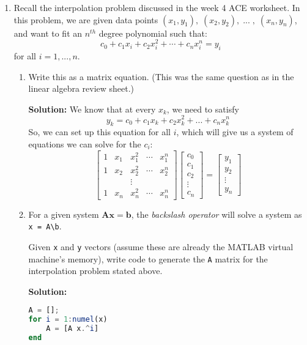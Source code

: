 \documentclass[letterpaper, 11pt]{article}
\begin{document}
\begin{enumerate}
\item Recall the interpolation problem discussed in the week 4 ACE worksheet. In this problem, we are given data points $(x_1,y_1), \; (x_2, y_2),\; ... \;,\; (x_n, y_n)$, and want to fit an $n^{th}$ degree polynomial such that:
\[c_0 + c_1x_i + c_2x_i^2 +\cdots + c_nx_i^n = y_i \]
for all $i = 1, ..., n$. 
\begin{enumerate}[label = (\alph*)]
\item Write this as a matrix equation. (This was the same question as in the linear algebra review sheet.)
\par \textbf{Solution:} We know that at every $x_k$, we need to satisfy
\[ y_k = c_0 + c_1 x_k + c_2 x_k^2 + ... + c_n x_k^n \]
So, we can set up this equation for all $i$, which will give us a system of equations we can solve for the $c_i$:
\[
\left[ \begin{array}{ccccc} 1 & x_1 & x_1^2 & \cdots & x_1^n \\
1 & x_2 & x_2^2 & \cdots & x_2^n \\
 && \vdots && \\
 1 & x_n & x_n^2 & \cdots & x_n^n 
 \end{array} \right] \left[ \begin{array}{c} c_0 \\ c_1 \\ c_2 \\ \vdots \\c_n \end{array} \right] = \left[ \begin{array}{c} y_1 \\ y_2 \\ \vdots \\ y_n \end{array} \right]
\]

\item For a given system $\bm{A} \bm{x} = \bm{b}$, the \textit{backslash operator} will solve a system as \texttt{x = A\textbackslash b}. 
\par Given \texttt{x} and \texttt{y} vectors (assume these are already the MATLAB virtual machine's memory), write code to generate the \texttt{A} matrix for the interpolation problem stated above.
\par\textbf{Solution:} 
\begin{lstlisting}[language=Octave]
A = [];
for i = 1:numel(x)
	A = [A x.^i]
end
\end{lstlisting}



\end{enumerate}
\end{enumerate}
\end{document}
